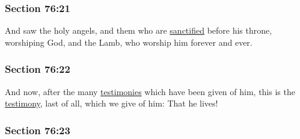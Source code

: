 
	\subsubsection{Section 76:21} %
		\label{DC76-21}

		And saw the holy angels, and them who are \hyperref[SANCTIFICATION]{sanctified} before his throne, worshiping God, and the Lamb, who worship him forever and ever.


	\subsubsection{Section 76:22} %
		\label{DC76-22}

		And now, after the many \hyperref[TESTIMONY]{testimonies} which have been given of him, this is the \hyperref[TESTIMONY]{testimony}, last of all, which we give of him: That he lives!


	\subsubsection{Section 76:23} %
		\label{DC76-23}

